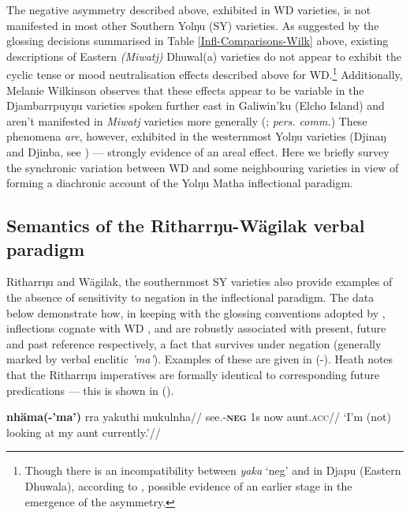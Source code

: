 The negative asymmetry described above, exhibited in WD varieties, is not manifested in most other Southern Yolŋu (SY) varieties. As suggested by the glossing decisions summarised in Table \ref{Infl-Comparisons-Wilk} above, existing descriptions of Eastern \textit{(Miwatj)} Dhuwal(a) varieties \citep{Morphy1983,Heath1980} do not appear to exhibit the cyclic tense or mood neutralisation effects described above for WD.\footnote{Though there is an incompatibility between \textit{yaka} `\gls{neg}' and \III{} in Djapu (Eastern Dhuwala), according to \citet[72]{Morphy1983}, possible evidence of an earlier stage in the emergence of the asymmetry.} Additionally, Melanie Wilkinson observes that these effects appear to be variable in the Djambarrpuyŋu varieties spoken further east in Galiwin'ku (Elcho Island) and aren't manifested in \textit{Miwatj} varieties more generally (\citeyear[431, 359\textit{ff}]{Wilkinson1991}; \textit{pers. comm.}) These phenomena \textit{are}, however, exhibited in the westernmost Yolŋu varieties (Djinaŋ and Djinba, see \citealp[192]{Waters1989}) --- strongly evidence of an areal effect. Here we briefly survey the synchronic variation between WD and some neighbouring varieties in view of forming a diachronic account of the Yolŋu Matha inflectional paradigm.

 
\subsection{Semantics of the Ritharrŋu-Wägilak verbal paradigm}

Ritharrŋu and Wägilak, the southernmost SY varieties also provide examples of the absence of sensitivity to negation in the inflectional paradigm. The data below demonstrate how, in keeping with the glossing conventions adopted by \citet{Heath1980r}, inflections cognate with WD \I, \II{} and \III{} are robustly associated with present, future and past reference respectively, a fact that survives under negation (generally marked by verbal enclitic \textit{\textdblhyphen'ma'}). Examples of these are given in (-). Heath notes that the Ritharrŋu imperatives are formally identical to corresponding future predications \citeyearpar[76]{Heath1980r} --- this is shown in ().


\ex\begingl\gla {}\textbf{nhäma}{\textbf{(-'ma')}} rra yakuthi mukulnha//
\glb see.\textbf{{\I}}{-\textsc{\textbf{neg}}} 1s now aunt.\textsc{acc}//
\glft`I'm (not) looking at my aunt currently.'\trailingcitation{[RN~20190520]}//\endgl{}\xe

